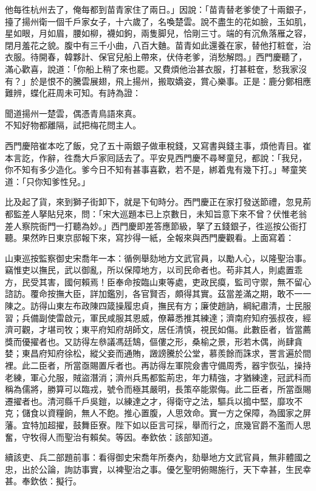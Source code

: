 他每徃杭州去了，俺每都到苗青家住了兩日。」因說：「苗青替老爹使了十兩銀子，擡了揚州衛一個千戶家女子，十六歲了，名喚楚雲。說不盡生的花如臉，玉如肌，星如眼，月如眉，腰如柳，襪如鉤，兩隻脚兒，恰剛三寸。端的有沉魚落雁之容，閉月羞花之貌。腹中有三千小曲，八百大麯。苗青如此還養在家，替他打粧奩，治衣服。待開春，韓夥計、保官兒船上帶來，伏侍老爹，消愁解悶。」西門慶聽了，滿心歡喜，說道：「你船上稍了來也罷。又費煩他治甚衣服，打甚粧奩，愁我家沒有？」於是恨不的騰雲展翅，飛上揚州，搬取嬌姿，賞心樂事。正是：鹿分鄭相應難辨，蝶化莊周未可知。有詩為證：

\begin{myquote} 
聞道揚州一楚雲，偶憑青鳥語來真。\\不知好物都離隔，試把梅花問主人。
\end{myquote} 

西門慶陪崔本吃了飯，兌了五十兩銀子做車稅錢，又寫書與錢主事，煩他青目。崔本言訖，作辭，徃喬大戶家囘話去了。平安見西門慶不尋琴童兒，都說：「我兒，你不知有多少造化。爹今日不知有甚事喜歡，若不是，綁着鬼有幾下打。」琴童笑道：「只你知爹性兒。」

比及起了貨，來到獅子街卸下，就是下旬時分。西門慶正在家打發送節禮，忽見荊都監差人拏貼兒來，問：「宋大巡題本已上京數日，{}未知旨意下來不曾？伏惟老翁差人察院衙門一打聽為妙。」西門慶即差答應節級，拏了五錢銀子，徃巡按公衙打聽。果然昨日東京邸報下來，寫抄得一紙，全報來與西門慶觀看。上面寫着：

\begin{myquote}[\markfont]
山東巡按監察御史宋喬年一本：循例舉劾地方文武官員，以勵人心，以隆聖治事。竊惟吏以撫民，武以御亂，所以保障地方，以司民命者也。苟非其人，則處置乖方，民受其害，國何賴焉！臣奉命按臨山東等處，吏政民瘼，監司守禦，無不留心諮訪。覆命按撫大臣，詳加鑑別，各官賢否，頗得其實。茲當差滿之期，敢不一一陳之。訪得山東左布政陳四箴操履忠貞，撫民有方；廉使趙訥，綱紀肅清，士民服習；兵備副使雷啟元，軍民咸服其恩威，僚幕悉推其練達；濟南府知府張叔夜，經濟可觀，才堪司牧；東平府知府胡師文，居任清慎，視民如傷。此數臣者，皆當薦獎而優擢者也。又訪得左叅議馮廷鵠，傴僂之形，桑榆之景，形若木偶，尚肆貪婪；東昌府知府徐松，縱父妾而通賄，譭謗騰於公堂，慕羨餘而誅求，詈言遍於間裡。此二臣者，所當亟賜置斥者也。再訪得左軍院僉書守備周秀，器宇恢弘，操持老練，軍心允服，賊盜潛消；濟州兵馬都監荊忠，年力精強，才猶練達，冠武科而稱為儒將，勝算可以臨戎，號令而極其嚴明，長策卒能禦侮。此二臣者，所當亟賜遷擢者也。清河縣千戶吳鎧，以練達之才，得衛守之法，驅兵以搗中堅，靡攻不克；儲食以資糧餉，無人不飽。推心置腹，人思效命。實一方之保障，為國家之屏藩。宜特加超擢，鼓舞臣寮。陛下如以臣言可採，舉而行之，庶幾官爵不濫而人思奮，守牧得人而聖治有賴矣。等因。奉欽依：該部知道。

續該吏、兵二部題前事：看得御史宋喬年所奏內，劾舉地方文武官員，無非體國之忠，出於公論，詢訪事實，以裨聖治之事。優乞聖明俯賜施行，天下幸甚，生民幸甚。奉欽依：擬行。
\end{myquote} 

